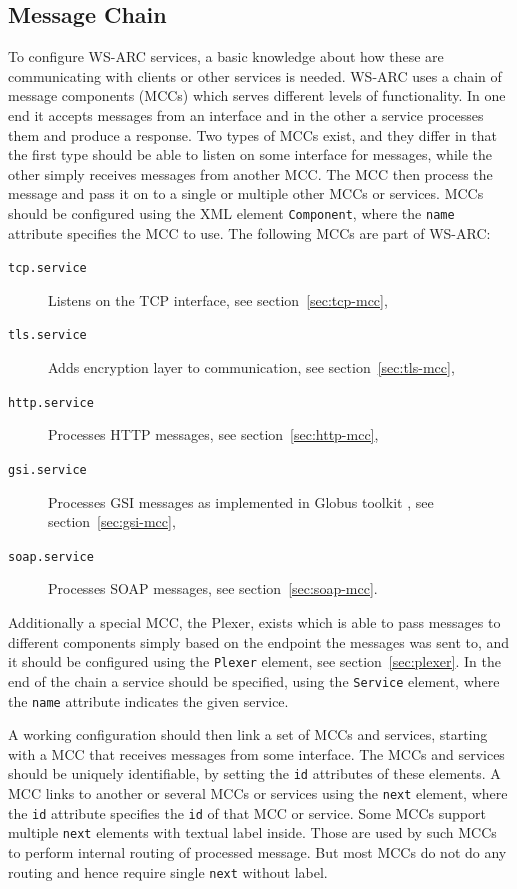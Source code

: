 \documentclass{article}
\begin{document}
\subsection{Message Chain}\label{sec:Message Chain}
To configure WS-ARC services, a basic knowledge about how these are
communicating with clients or other services is needed. WS-ARC uses a chain of
message components (MCCs) which serves different levels of functionality. In one
end it accepts messages from an interface and in the other a service processes
them and produce a response. Two types of MCCs exist, and they differ in that
the first type should be able to listen on some interface for messages, while
the other simply receives messages from another MCC. The MCC then process
the message and pass it on to a single or multiple other MCCs or services.
MCCs should be configured using the XML element \texttt{Component}, where the
\texttt{name} attribute specifies the MCC to use. The following MCCs are part
of WS-ARC:
\begin{description}
\item[\texttt{tcp.service}] Listens on the TCP interface, see
  section~\ref{sec:tcp-mcc},
\item[\texttt{tls.service}] Adds encryption layer to communication, see
  section~\ref{sec:tls-mcc},
\item[\texttt{http.service}] Processes HTTP messages, see
  section~\ref{sec:http-mcc},
\item[\texttt{gsi.service}] Processes GSI messages as implemented in
Globus toolkit \cite{globus}, see section~\ref{sec:gsi-mcc},
\item[\texttt{soap.service}] Processes SOAP messages, see
  section~\ref{sec:soap-mcc}.
\end{description}
Additionally a special MCC,
the Plexer, exists which is able to pass messages to different components simply
based on the endpoint the messages was sent to, and it should be
configured using the \texttt{Plexer} element, see section~\ref{sec:plexer}. In
the end of the chain a service should be specified, using the \texttt{Service}
element, where the \texttt{name} attribute indicates the given service.

A working configuration should then link a set of MCCs and services, starting
with a MCC that receives messages from some interface. The MCCs and services
should be uniquely identifiable, by setting the \texttt{id} attributes of these
elements. A MCC links to another or several MCCs or services using the
\texttt{next} element, where the \texttt{id} attribute specifies the \texttt{id}
of that MCC or service. Some MCCs support multiple \texttt{next} elements with
textual label inside. Those are used by such MCCs to perform internal routing
of processed message. But most MCCs do not do any routing and hence require
single \texttt{next} without label.
\end{document}
